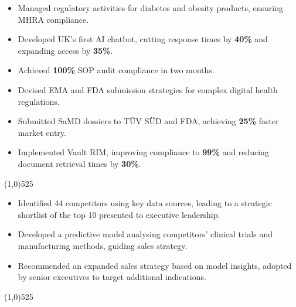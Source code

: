 \documentclass[a4paper]{deedy-resume} %
\begin{document}
\begin{multicols}{2}
    \begin{itemize}
        \item Managed regulatory activities for diabetes and obesity products, ensuring MHRA compliance.
        \item Developed UK's first AI chatbot, cutting response times by \textbf{40\%} and expanding access by \textbf{35\%}.
        \item Achieved \textbf{100\%} SOP audit compliance in two months.
    \end{itemize}
    \columnbreak
    \begin{itemize}
        \item Devised EMA and FDA submission strategies for complex digital health regulations.
        \item Submitted SaMD dossiers to TÜV SÜD and FDA, achieving \textbf{25\%} faster market entry.
        \item Implemented Vault RIM, improving compliance to \textbf{99\%} and reducing document retrieval times by \textbf{30\%}.
    \end{itemize}
\end{multicols}

\vspace{-10pt}

\begin{center}
    \vspace{-17pt}
    \line(1,0){525}
    \vspace{-11pt}
\end{center}
\vspace{-10pt}
\begin{multicols}{2}
    \begin{itemize}
        \item Identified 44 competitors using key data sources, leading to a strategic shortlist of the top 10 presented to executive leadership.
        \item Developed a predictive model analysing competitors' clinical trials and manufacturing methods, guiding sales strategy.
        \item Recommended an expanded sales strategy based on model insights, adopted by senior executives to target additional indications.
    \end{itemize}
\end{multicols}
\vspace{-5pt}
\begin{center}
    \vspace{-17pt}
    \line(1,0){525}
    \vspace{-11pt}
\end{center}
\end{document}
